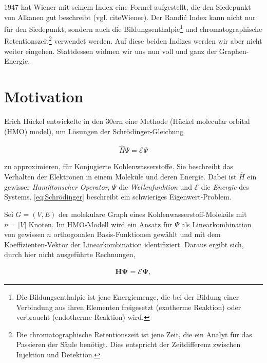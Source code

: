         \begin{remark}

            1947 hat Wiener mit seinem Index eine Formel aufgestellt, die den Siedepunkt von Alkanen gut beschreibt (vgl. cite{Wiener}).
            Der Randić Index kann nicht nur für den Siedepunkt, sondern auch die Bildungsenthalpie\footnote{Die Bildungsenthalpie ist jene Energiemenge, die bei der Bildung einer Verbindung aus ihren Elementen freigesetzt (exotherme Reaktion) oder verbraucht (endotherme Reaktion) wird.} und chromatographische Retentionszeit\footnote{Die chromatographische Retentionszeit ist jene Zeit, die ein Analyt für das Passieren der Säule benötigt. Dies entspricht der Zeitdifferenz zwischen Injektion und Detektion.} verwendet werden.
            Auf diese beiden Indizes werden wir aber nicht weiter eingehen.
            Stattdessen widmen wir uns nun voll und ganz der Graphen-Energie.

        \end{remark}

    \section{Motivation}

        Erich Hückel entwickelte in den 30ern eine Methode (Hückel molecular orbital (HMO) model), um Lösungen der Schrödinger-Gleichung

        \begin{align} \label{eq:Schrödinger}
            \hat H \Psi = \mathcal E \Psi
        \end{align}

        zu approximieren, für Konjugierte Kohlenwasserstoffe.
        Sie beschreibt das Verhalten der Elektronen in einem Moleküle und deren Energie.
        Dabei ist $\hat H$ ein gewisser \textit{Hamiltonscher Operator}, $\Psi$ die \textit{Wellenfunktion} und $\mathcal E$ die \textit{Energie} des Systems.
        \eqref{eq:Schrödinger} beschreibt ein schwieriges Eigenwert-Problem.

        Sei $G = (V, E)$ der molekulare Graph eines Kohlenwasserstoff-Moleküls mit $n = |V|$ Knoten.
        Im HMO-Modell wird ein Ansatz für $\Psi$ als Linearkombination von gewissen $n$ orthogonalen Basis-Funktionen gewählt und mit dem Koeffizienten-Vektor der Linearkombination identifiziert.
        Daraus ergibt sich, durch hier nicht ausgeführte Rechnungen,

        \begin{align} \label{eq:Schrödinger_lite}
            \mathbf H \mathbf \Psi = \mathcal E \mathbf \Psi,
        \end{align}

